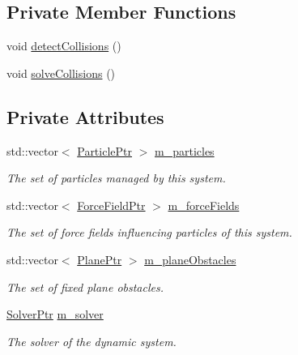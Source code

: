\subsection*{Private Member Functions}
\begin{DoxyCompactItemize}
\item 
void \hyperlink{classDynamicSystem_a2d49adacd1b23a34be32af0f8e242dee}{detect\+Collisions} ()
\item 
void \hyperlink{classDynamicSystem_a66d39ad73d55813efbecd955638cc56f}{solve\+Collisions} ()
\end{DoxyCompactItemize}
\subsection*{Private Attributes}
\begin{DoxyCompactItemize}
\item 
std\+::vector$<$ \hyperlink{Particle_8hpp_a9a7abc8635002993537b61ef2c857fdd}{Particle\+Ptr} $>$ \hyperlink{classDynamicSystem_a5ffb31272437d0d2194fb9a3e2503507}{m\+\_\+particles}
\begin{DoxyCompactList}\small\item\em The set of particles managed by this system. \end{DoxyCompactList}\item 
std\+::vector$<$ \hyperlink{ForceField_8hpp_a42f2dc2cbbb9e0d734b92850c7b40d58}{Force\+Field\+Ptr} $>$ \hyperlink{classDynamicSystem_ae84cfd726e249320529381e124c640d9}{m\+\_\+force\+Fields}
\begin{DoxyCompactList}\small\item\em The set of force fields influencing particles of this system. \end{DoxyCompactList}\item 
std\+::vector$<$ \hyperlink{Plane_8hpp_a146e10989049e4a48eae6973c2f798f5}{Plane\+Ptr} $>$ \hyperlink{classDynamicSystem_a64b84936db934e46bf4d14d298536f29}{m\+\_\+plane\+Obstacles}
\begin{DoxyCompactList}\small\item\em The set of fixed plane obstacles. \end{DoxyCompactList}\item 
\hyperlink{Solver_8hpp_a0913049810bea42e7eeb97b03da7a93d}{Solver\+Ptr} \hyperlink{classDynamicSystem_a5c1688e3ba7e44f1231949a27107f8af}{m\+\_\+solver}
\begin{DoxyCompactList}\small\item\em The solver of the dynamic system. \end{DoxyCompactList}\item 

\end{DoxyCompactItemize}
